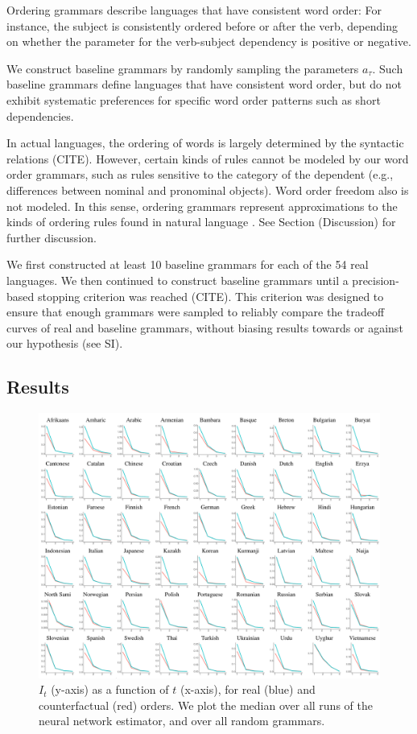 Ordering grammars describe languages that have consistent word order:
For instance, the subject is consistently ordered before or after the verb, depending on whether the parameter for the verb-subject dependency is positive or negative.

We construct baseline grammars by randomly sampling the parameters $a_\tau$.
Such baseline grammars define languages that have consistent word order, but do not exhibit systematic preferences for specific word order patterns such as short dependencies.


In actual languages, the ordering of words is largely determined by the syntactic relations (CITE).
However, certain kinds of rules cannot be modeled by our word order grammars, such as rules sensitive to the category of the dependent (e.g., differences between nominal and pronominal objects).
Word order freedom also is not modeled.
In this sense, ordering grammars represent approximations to the kinds of ordering rules found in natural language \citep{gildea-optimizing-2007, gildea-grammars-2010, gildea-human-2015}.
See Section (Discussion) for further discussion.


We first constructed at least 10 baseline grammars for each of the 54 real languages.
We then continued to construct baseline grammars until a precision-based stopping criterion was reached (CITE). This criterion was designed to ensure that enough grammars were sampled to reliably compare the tradeoff curves of real and baseline grammars, without biasing results towards or against our hypothesis (see SI).

\subsection{Results}

\begin{figure}
	\begin{center}
\includegraphics[width=\textwidth]{it-table.pdf}
\end{center}
	\caption{$I_t$ (y-axis) as a function of $t$ (x-axis), for real (blue) and counterfactual (red) orders. We plot the median over all runs of the neural network estimator, and over all random grammars.}\label{fig:it}
\end{figure}



